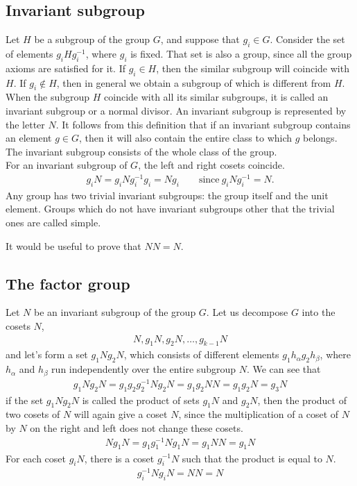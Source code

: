 
\subsection{Invariant subgroup}
Let $H$ be a subgroup of the group $G$, and suppose that $g_i\in G$. Consider
the set of elements $g_iHg^{-1}_i$, where $g_i$ is fixed. That set is also
a group, since all the group axioms are satisfied for it.
If $g_i\in H$, then the similar subgroup will coincide with $H$. If $g_i\notin H$,
then in general we obtain a subgroup of which is different from $H$. When the
subgroup $H$ coincide with all its similar subgroups, it is called an invariant
subgroup or a normal divisor. An invariant subgroup is represented by the letter
$N$. It follows from this definition that if an invariant subgroup contains an
element $g\in G$, then it will also contain the entire class to which $g$
belongs. The invariant subgroup consists of the whole class of the group.\\

For an invariant subgroup of $G$, the left and right cosets coincide.
\begin{align}
    g_iN=g_iNg_i^{-1}g_i=Ng_i\qquad\text{since}\ g_iNg_i^{-1}=N.
\end{align}
Any group has two trivial invariant subgroups: the group itself and the unit
element. Groups which do not have invariant subgroups other that the trivial
ones are called simple.

It would be useful to prove that $NN=N$.

\subsection{The factor group} %
\label{sub:The factor group}

Let $N$ be an invariant subgroup of the group $G$. Let us decompose $G$ into the
cosets $N$,
\begin{align}
    N, g_1N, g_2N,\dots,g_{k-1}N
\end{align}
and let's form a set $g_1Ng_2N$, which consists of different elements
$g_1h_\alpha g_2h_\beta$, where $h_\alpha$ and $h_\beta$ run independently over
the entire subgroup $N$. We can see that
\begin{align}
    g_1Ng_2N=g_1g_2g_2^{-1}Ng_2N=g_1g_2NN=g_1g_2N=g_3N
\end{align}
if the set $g_1Ng_2N$ is called the product of sets $g_1N$ and $g_2N$, then the
product of two cosets of $N$ will again give a coset $N$, since the multiplication
of a coset of $N$ by $N$ on the right and left does not change these cosets.
\begin{align}
    Ng_1N=g_1g_1^{-1}Ng_1N=g_1NN=g_1N
\end{align}
For each coset $g_iN$, there is a coset $g_i^{-1}N$ such that the product is
equal to $N$.
\begin{align}
    g_i^{-1}Ng_iN=NN=N
\end{align}

